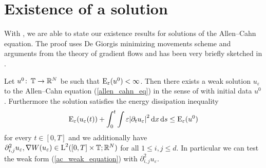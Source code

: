 \section{Existence of a solution}

With , we are able to state our existence results for 
solutions of the Allen--Cahn equation. The proof uses De Giorgis minimizing 
movements scheme and arguments from the theory of gradient flows and has been 
very 
briefly sketched in 
\cite{convergence_of_allen_cahn_equation_to_multiphase_mean_curvature_flow}. 

\begin{theorem}
	\label{existence_of_ac_solution}
	Let $ u^{ 0 } \colon \operatorname{\mathbb{T}} \to \mathbb{ R }^{ N } $ be such that 
	$ \operatorname{E}_{ \varepsilon } ( u^{ 0 } ) < \infty $.
	Then there exists a weak solution $ u_{ \varepsilon} $ to the Allen--Cahn 
	equation (\ref{allen_cahn_eq}) in the sense of  with 
	initial data $ u^{ 0 } $.
	Furthermore the solution satisfies the energy dissipation inequality
	\begin{equation}
		\label{energy_dissipation_sharp}
		\operatorname{E}_{ \varepsilon } ( u_{ \varepsilon } ( t ) )
		+
		\int_{ 0 }^{ t }
		\int
		\varepsilon \abs{ \partial_{ t } u_{ \varepsilon } }^{ 2 }
		\dd{ x }
		\dd{ s }
		\leq
		\operatorname{E}_{ \varepsilon } ( u^{ 0 } )
	\end{equation}
	for every $ t \in [ 0 , T ] $ and we additionally have
	$
	\partial_{ i , j }^{ 2 } u_{ \varepsilon }, \nabla W ( u_{ \varepsilon } ) \in \operatorname{L}^{ 2 } ( [0, T] \times \operatorname{\mathbb{T}} ; \mathbb{ R }^{ N } ) 
	$
	for all $ 1 \leq i, j \leq d $. In particular we can test the weak form (\ref{ac_weak_equation}) with $ \partial_{ i , j }^{ 2 } u_{ \varepsilon } $.
\end{theorem}

